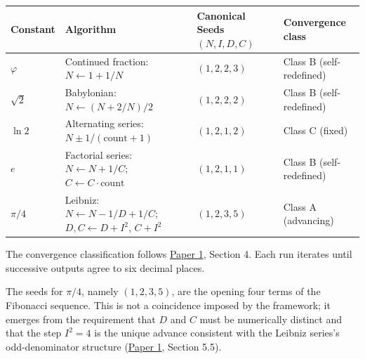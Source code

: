 \documentclass[12pt]{article}
\begin{document}
\begin{longtable}[]{@{}
  >{\raggedright\arraybackslash}p{}
  >{\raggedright\arraybackslash}p{}
  >{\raggedright\arraybackslash}p{}
  >{\raggedright\arraybackslash}p{}@{}}
\toprule\noalign{}
\begin{minipage}[b]{\linewidth}\raggedright
Constant
\end{minipage} & \begin{minipage}[b]{\linewidth}\raggedright
Algorithm
\end{minipage} & \begin{minipage}[b]{\linewidth}\raggedright
Canonical Seeds \((N, I, D, C)\)
\end{minipage} & \begin{minipage}[b]{\linewidth}\raggedright
Convergence class
\end{minipage} \\
\midrule\noalign{}
\endhead
\bottomrule\noalign{}
\endlastfoot
\(\varphi\) & Continued fraction: \(N \leftarrow 1 + 1/N\) &
\((1, 2, 2, 3)\) & Class B (self-redefined) \\
\(\sqrt{2}\) & Babylonian: \(N \leftarrow (N + 2/N)/2\) &
\((1, 2, 2, 2)\) & Class B (self-redefined) \\
\(\ln 2\) & Alternating series: \(N \pm 1/(\text{count}+1)\) &
\((1, 2, 1, 2)\) & Class C (fixed) \\
\(e\) & Factorial series: \(N \leftarrow N + 1/C\);
\(C \leftarrow C \cdot \text{count}\) & \((1, 2, 1, 1)\) & Class B
(self-redefined) \\
\(\pi/4\) & Leibniz: \(N \leftarrow N - 1/D + 1/C\);
\(D, C \leftarrow D + I^2\), \(C + I^2\) & \((1, 2, 3, 5)\) & Class A
(advancing) \\
\end{longtable}

The convergence classification follows
\href{https://github.com/baardev/truevalue/blob/main/docnav/Research/papers/1_recursive-tholonic-five-constants/1_recursive-tholonic-five-constants.pdf}{Paper
1}, Section 4. Each run iterates until successive outputs agree to six
decimal places.

The seeds for \(\pi/4\), namely \((1, 2, 3, 5)\), are the opening four
terms of the Fibonacci sequence. This is not a coincidence imposed by
the framework; it emerges from the requirement that \(D\) and \(C\) must
be numerically distinct and that the step \(I^2 = 4\) is the unique
advance consistent with the Leibniz series's odd-denominator structure
(\href{https://github.com/baardev/truevalue/blob/main/docnav/Research/papers/1_recursive-tholonic-five-constants/1_recursive-tholonic-five-constants.pdf}{Paper
1}, Section 5.5).
\end{document}
